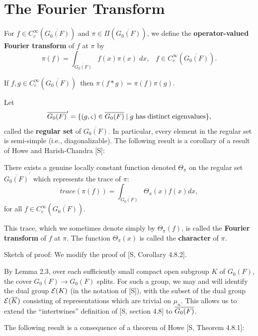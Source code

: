 \section{The Fourier Transform}

For $f\in C_c^\infty (\overline{G_0(F)})$ and
$\pi \in \Pi (\overline{G_0(F)})$, we define the
{\bf operator-valued Fourier transform} of $f$ at $\pi $
by 
\[
\pi (f)=\int_{\overline{G_0(F)}}f(x)\pi (x)\;dx,\;\;\;f\in C_c^\infty (%
\overline{G_0(F)}). 
\]

\begin{lemma}
If $f,g\in C_c^\infty (\overline{G_0(F)})$\ then $\pi (f*g)=\pi (f)\pi (g).$
\end{lemma}

Let
\[
\overline{G_0(F)}^{\prime }=\{(g,\varsigma )\in
\overline{G_0(F)}\;|\;g\;{\rm has\;distinct\;eigenvalues}\},
\]
called the {\bf regular set} of 
$\overline{G_0(F)}.$ In particular, every element in the regular set is
semi-simple (i.e., diagonalizable). The following result is a corollary of a
result of Howe and Harish-Chandra [S]:

\begin{lemma}
There exists a genuine locally constant function denoted $\Theta _\pi $ on
the regular set $\overline{G_0(F)}^{\prime }$ which represents the trace of
$\pi :$
\[
trace(\pi (f))=\int_{\overline{G_0(F)}}\Theta _\pi (x)f(x)dx,
\]
for all $f\in C_c^\infty (\overline{G_0(F)}).$
\end{lemma}

This trace, which we sometimes denote simply by $\Theta _\pi (f)$, is called
the {\bf Fourier transform} of $f$ at $\pi $. The function $\Theta _\pi (x)$
is called the {\bf character} of $\pi $.

Sketch of proof: We modify the proof of [S, Corollary 4.8.2].

By Lemma 2.3, over each sufficiently small compact open subgroup $K$ of $%
G_0(F)$, the cover $\overline{G_0(F)}\rightarrow G_0(F)$ splits. For such a
group, we may and will identify the dual group ${\cal E}(K)$ (in the
notation of [S]), with the subset of the dual group ${\cal E}(\overline{K})$
consisting of representations which are trivial on $\mu _n$. This allows us
to extend the ``intertwines'' definition of [S, section 4.8] to $\overline{%
G_0(F)}$.

The following result is a consequence of a theorem of Howe [S, Theorem
4.8.1]:

